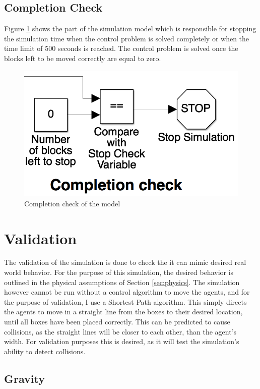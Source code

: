 \subsection{Completion Check}
Figure \ref{fig:completion_check} shows the part of the simulation model which is responsible for stopping the simulation time when the control problem is solved completely or when the time limit of 500 seconds is reached. The control problem is solved once the blocks left to be moved correctly are equal to zero. 

\begin{figure}[H]
  \centering
  \includegraphics[width=.6\columnwidth]{figures/completion_check}
  \caption{\label{fig:completion_check}Completion check of the model}
\end{figure}

\section{Validation}
\label{sec:validation}

The validation of the simulation is done to check the it can mimic desired real world behavior. For the purpose of this simulation, the desired behavior is outlined in the physical assumptions of Section \ref{sec:physics}. The simulation however cannot be run without a control algorithm to move the agents, and for the purpose of validation, I use a Shortest Path algorithm. This simply directs the agents to move in a straight line from the boxes to their desired location, until all boxes have been placed correctly. This can be predicted to cause collisions, as the straight lines will be closer to each other, than the agent's width. For validation purposes this is desired, as it will test the simulation's ability to detect collisions. 


\subsection{Gravity}
\label{sim:sec:gravity}

